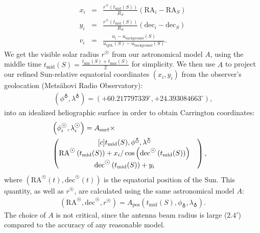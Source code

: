 \documentclass{aa}
\newcommand{\arrc}[1]{\begin{matrix}[c] #1 \end{matrix}}
\newcommand{\eqnl}[2]{\begin{eqnarray}\label{#1}#2\end{eqnarray}}
\newcommand{\s}[2]{{#1}_{\mathrm{#2}}}
\begin{document}
\eqnl{calibration}{
x_i &=& \frac{r^{\astrosun} \left( \s{t}{mid}(S) \right)}{R_S} \left( \mathrm{RA}_i -  \mathrm{RA}_S  \right) \\
y_i &=& \frac{r^{\astrosun} \left( \s{t}{mid}(S) \right)}{R_S} \left( \mathrm{dec}_i - \mathrm{dec}_S \right) \\
v_i &=& \frac{u_i - \s{u}{background}(S)}{\s{u}{QSL}(S) - \s{u}{background}(S)} \text{.}
}
We get the visible solar radius $r^{\astrosun}$ from our astronomical model $A$, using the middle time $\s{t}{mid}(S) = 
\frac{\s{t}{min}(S) + \s{t}{max}(S)}{2}$ for simplicity. We then use $A$ to project our refined Sun-relative equatorial coordinates $(x_i,y_i)$ 
from the observer's geolocation (Metsähovi Radio Observatory):
\eqnl{mro_geolocation}{
(\phi^{\earth}, \lambda^{\earth}) = \left( +60.217797339^{\circ}, +24.393084663^{\circ} 
\right) \text{,}}
into an idealized heliographic surface 
in order to obtain Carrington coordinates:
\eqnl{carrington_coordinates}{
&\left( \phi^{\astrosun}_i, 
\lambda^{\astrosun}_i \right) = A_{\rm surf} \times& \\
&\left( \arrc{\s{t}{mid}(S), \phi^{\earth}, \lambda^{\earth}
\\
\mathrm{RA}^{\astrosun} \left( \s{t}{mid}(S) \right) + x_i / \cos \left( \mathrm{dec}^{\astrosun} \left( \s{t}{mid}(S) \right) \right)&
\\
\mathrm{dec}^{\astrosun} \left( \s{t}{mid}(S) \right) + y_i} \right) \nonumber 
\text{,}
}
where $\left( \mathrm{RA}^{\astrosun}(t), \mathrm{dec}^{\astrosun}(t) \right)$ is the equatorial position of the Sun. This quantity, as well as $r^{\astrosun}$, are calculated using the same astronomical model $A$:
\eqnl{astromodel}{
\left( \mathrm{RA}^{\astrosun}, \mathrm{dec}^{\astrosun}, r^{\astrosun} \right) = \s{A}{pos} \left( \s{t}{mid}(S), \phi_{\earth}, \lambda_{\earth} \right) \text{.}
}
The choice of $A$ is not critical, since the antenna beam radius is large ($2.4 \prime$) compared to the accuracy of any 
reasonable model.
\end{document}
